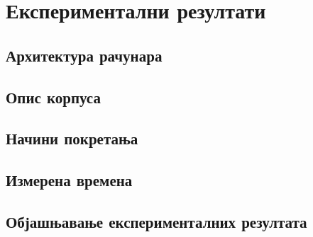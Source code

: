 \documentclass[12pt,oneside]{memoir}
\begin{document}
\chapter{Експериментални резултати}
  \section{Архитектура рачунара}
  \section{Опис корпуса}
  \section{Начини покретања}
  \section{Измерена времена}
 \section{Објашњавање експерименталних резултата}

\literatura
\backmatter
\end{document}

